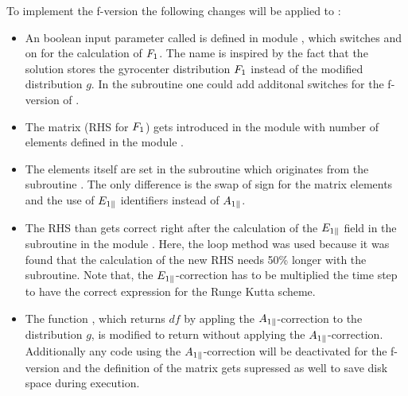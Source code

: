 
\newpage
To implement the f-version the following changes will be applied to {\gkw}:
\begin{itemize}
    \item An boolean input parameter called  is defined in module , which switches  and  on for the calculation of $F_1$. The name is inspired by the fact that the solution  stores the gyrocenter distribution $F_1$ instead of the modified distribution $g$. In the subroutine  one could add additonal switches for the f-version of {\gkw}.
    \item The matrix  (RHS for $F_1$) gets introduced in the module  with  number of elements defined in the module .
    \item The elements itself are set in the subroutine  which originates from the subroutine . The only difference is the swap of sign for the matrix elements and the use of $E_{1\parallel}$ identifiers instead of $A_{1\parallel}$.
    \item The RHS than gets correct right after the calculation of the $E_{1\parallel}$ field in the subroutine  in the module . Here, the loop method was used because it was found that the calculation of the new RHS needs 50\% longer with the  subroutine. Note that, the $E_{1\parallel}$-correction has to be multiplied the time step  to have the correct expression for the Runge Kutta scheme.
    \item The function , which returns $df$ by appling the $A_{1\parallel}$-correction to the distribution $g$, is modified to return  without applying the $A_{1\parallel}$-correction. Additionally any code using the $A_{1\parallel}$-correction will be deactivated for the f-version and the definition of the matrix  gets supressed as well to save disk space during execution.

\end{itemize}
